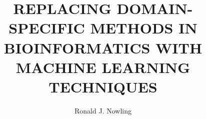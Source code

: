 \documentclass[review,numrefs,twoadvisors,sort&compress]{nddiss2e}
\begin{document}
\frontmatter

\title{REPLACING DOMAIN-SPECIFIC METHODS IN BIOINFORMATICS WITH MACHINE LEARNING TECHNIQUES}

\author{Ronald J. Nowling}





\maketitle

\makecopyright



\tableofcontents
\listoffigures
\listoftables



\mainmatter








\appendix


\backmatter



\end{document}
